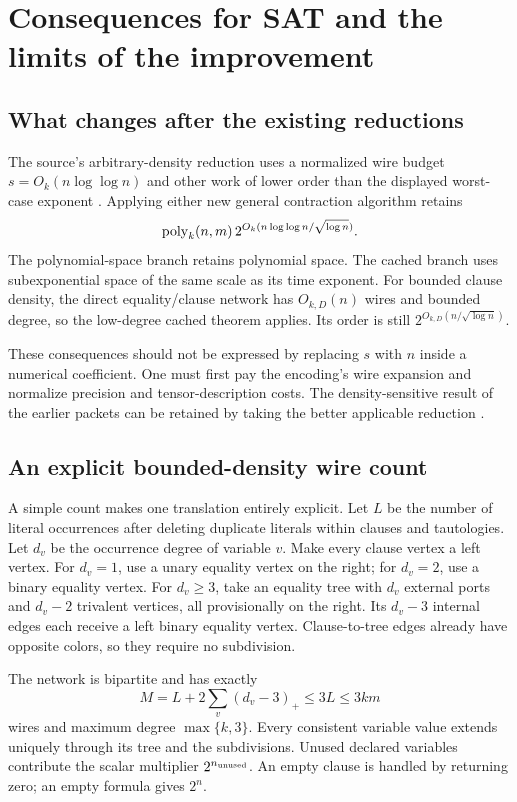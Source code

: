 \section{Consequences for SAT and the limits of the improvement}
\label{sec:consequences}

\subsection{What changes after the existing reductions}

The source's arbitrary-density reduction uses a normalized wire budget
$s=O_k(n\log\log n)$ and other work of lower order than the displayed
worst-case exponent \cite{source}. Applying either new general
contraction algorithm retains
\[
 \operatorname{poly}_k(n,m)\,2^{O_k(n\log\log n/\sqrt{\log n})}.
\]
The polynomial-space branch retains polynomial space. The cached branch
uses subexponential space of the same scale as its time exponent.
For bounded clause density, the direct equality/clause network has
$O_{k,D}(n)$ wires and bounded degree, so the low-degree cached theorem
applies. Its order is still $2^{O_{k,D}(n/\sqrt{\log n})}$.

These consequences should not be expressed by replacing $s$ with $n$
inside a numerical coefficient. One must first pay the encoding's
wire expansion and normalize precision and tensor-description costs.
The density-sensitive result of the earlier packets can be retained
by taking the better applicable reduction \cite{density}.

\subsection{An explicit bounded-density wire count}
\label{sec:wirecount}

A simple count makes one translation entirely explicit.
Let $L$ be the number of literal occurrences after deleting duplicate
literals within clauses and tautologies. Let $d_v$ be the occurrence
degree of variable $v$. Make every clause vertex a left vertex. For
$d_v=1$, use a unary equality vertex on the right; for $d_v=2$, use
a binary equality vertex. For $d_v\ge3$, take an equality tree with
$d_v$ external ports and $d_v-2$ trivalent vertices, all provisionally
on the right. Its $d_v-3$ internal edges each receive a left binary
equality vertex. Clause-to-tree edges already have opposite colors,
so they require no subdivision.

The network is bipartite and has exactly
\begin{equation}
 M=L+2\sum_v(d_v-3)_+\le3L\le3km
 \label{eq:explicit-wires}
\end{equation}
wires and maximum degree $\max\{k,3\}$. Every consistent variable
value extends uniquely through its tree and the subdivisions.
Unused declared variables contribute the scalar multiplier
$2^{n_{\rm unused}}$. An empty clause is handled by returning zero;
an empty formula gives $2^n$.

